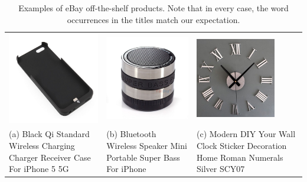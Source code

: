 \begin{table}[t]
\caption{Examples of eBay off-the-shelf products. Note that in every case, the word occurrences in the titles match our expectation.}
\label{tab:ebay-standard-products}
\begin{center}
\begin{tabular}{LLL}
\includegraphics[height=4.0cm]{figures/standard-iphone-case.jpg}&\includegraphics[height=4.0cm]{figures/standard-iphone-speaker.jpg}&\includegraphics[height=3.5cm]{figures/standard-clock.jpg}\\
(a) Black Qi Standard Wireless Charging Charger Receiver Case For iPhone 5 5G & (b) Bluetooth Wireless Speaker Mini Portable Super Bass For iPhone & (c) Modern DIY Your Wall Clock Sticker Decoration Home Roman Numerals Silver SCY07\\
\end{tabular}
\end{center}
\end{table}


